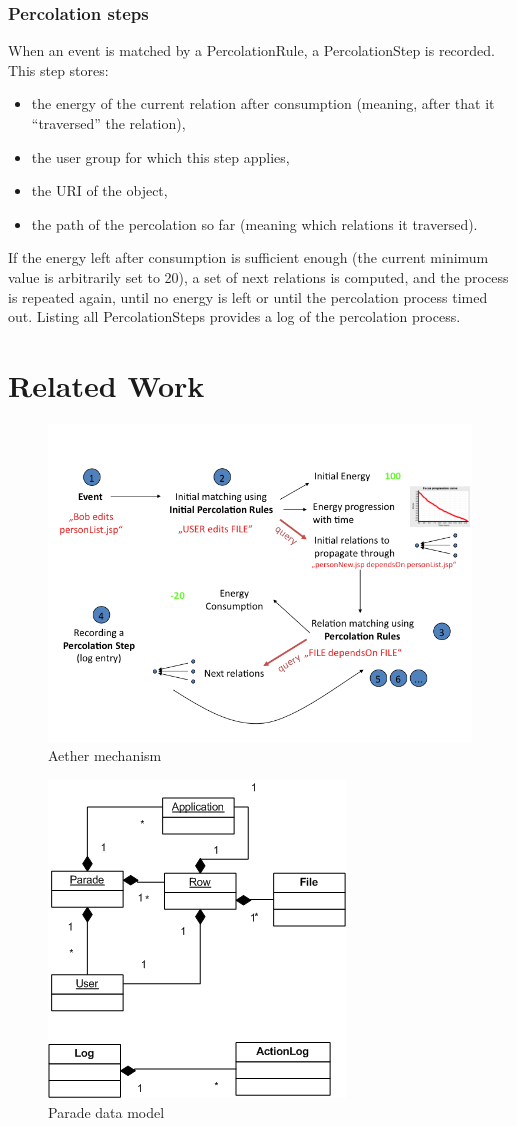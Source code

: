 \documentclass{ecscw2007}
\begin{document}
\subsubsection*{Percolation steps}
When an event is matched by a PercolationRule, a PercolationStep is recorded. This step stores:
\begin{itemize}
	\item the energy of the current relation after consumption (meaning, after that it ``traversed'' the relation),
    \item the user group for which this step applies,
    \item the URI of the object,
    \item the path of the percolation so far (meaning which relations it traversed).
\end{itemize}
    
If the energy left after consumption is sufficient enough (the current minimum value is arbitrarily set to 20), a set of next relations is computed, and the process is repeated again, until no energy is left or until the percolation process timed out.
Listing all PercolationSteps provides a log of the percolation process.

\section*{Related Work} 


\begin{figure}[thb]
  \centering
  \includegraphics[width=.7\linewidth]{aether-mechanism}
  \caption{Aether mechanism}
  \label{fig:aether-mechanism}
\end{figure}

\begin{figure}[thb]
  \centering
  \includegraphics[width=.4\linewidth]{parade-data-model}
  \caption{Parade data model}
  \label{fig:parade-data-model}
\end{figure}
\end{document}
